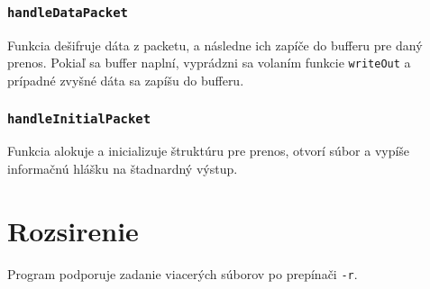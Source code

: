 \documentclass{article}
\renewcommand{\tt}[1]{\texttt{#1}}
\begin{document}
\subsubsection{\tt{handleDataPacket}}
Funkcia dešifruje dáta z packetu, a následne ich zapíče do bufferu pre daný prenos.
Pokiaľ sa buffer naplní, vyprádzni sa volaním funkcie \tt{writeOut} a prípadné zvyšné dáta sa zapíšu do bufferu.

\subsubsection{\tt{handleInitialPacket}}
Funkcia alokuje a inicializuje štruktúru pre prenos, otvorí súbor a vypíše informačnú hlášku na štadnardný výstup.


\section{Rozsirenie}
Program podporuje zadanie viacerých súborov po prepínači \tt{-r}.
\end{document}

